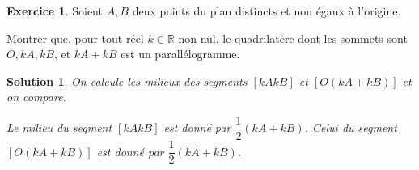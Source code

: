 \documentclass[a4paper, 14pt]{extarticle}
\theoremstyle{plain}
\newtheorem*{sol}{Solution}
\theoremstyle{definition}
\newtheorem{ex}{Exercice}
\newcommand{\R}{\mathbb{R}}
\newcommand{\exe}[2]{
		\begin{ex} #1  \end{ex}
		\begin{sol} #2 \end{sol}
	}
\newcommand{\exe}[2]{
		\begin{ex} #1  \end{ex}
	}
\begin{document}
%

\exe{
	Soient $A, B$ deux points du plan distincts et non égaux à l'origine.
	
	Montrer que, pour tout réel $k \in \R$ non nul, le quadrilatère dont les sommets sont $O, kA, kB$, et $kA + kB$ est un parallélogramme.
}{

	On calcule les milieux des segments $[kAkB]$ et $[O(kA+kB)]$ et on compare.
	
	Le milieu du segment $[kAkB]$ est donné par $\dfrac12(kA + kB)$. 
	Celui du segment $[O(kA+kB)]$ est donné par $\dfrac12(kA+kB)$.

}


%	
%
%
\end{document}
